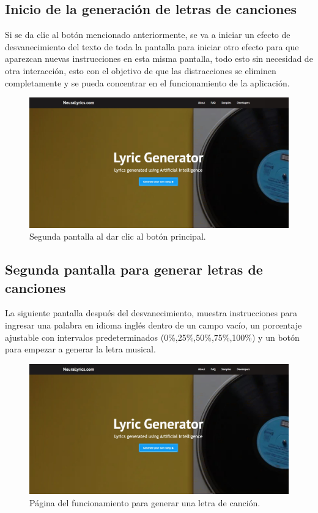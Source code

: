 \documentclass[12pt, a4paper, titlepage]{article}
\begin{document}
	\subsection{Inicio de la generación de letras de canciones}
		Si se da clic al botón mencionado anteriormente, se va a iniciar un efecto de desvanecimiento del texto de toda la pantalla para iniciar otro efecto para que aparezcan nuevas instrucciones en esta misma pantalla, todo esto sin necesidad de otra interacción, esto con el objetivo de que las distracciones se eliminen completamente y se pueda concentrar en el funcionamiento de la aplicación.
		\begin{figure}[H] 
			\includegraphics[width=13.5cm]{./Imagenes/Capturas/pprincipal.jpg}
			\centering \caption{Segunda pantalla al dar clic al botón principal.}
		\end{figure}
	\subsection{Segunda pantalla para generar letras de canciones}
	La siguiente pantalla después del desvanecimiento, muestra instrucciones para ingresar una palabra en idioma inglés dentro de un campo vacío, un porcentaje ajustable con intervalos predeterminados (0\%,25\%,50\%,75\%,100\%) y un botón para empezar a generar la letra musical.
	\begin{figure}[H] 
		\includegraphics[width=13.5cm]{./Imagenes/Capturas/pprincipal.jpg}
		\centering \caption{Página del funcionamiento para generar una letra de canción.}
	\end{figure}
	
\end{document}
